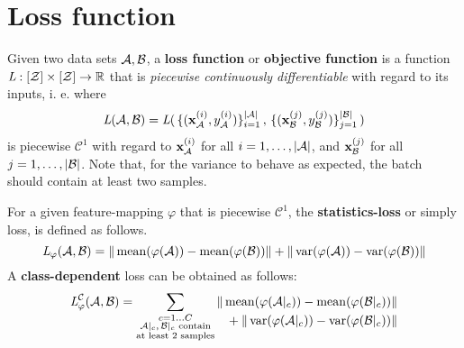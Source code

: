 \section{Loss function}
Given two data sets $\mathcal A, \mathcal B$, a \textbf{loss function} or \textbf{objective function} is a function $\textit{L} : [\mathcal Z] \times [\mathcal Z] \to \mathbb{R}$ that is \textit{piecewise continuously differentiable} with regard to its inputs,
i. e. where 
\[
    \textit{L} (\mathcal A, \mathcal B) = \textit{L} (
    \,\{(\mathbf x^{(i)}_{\mathcal A}, y^{(i)}_{\mathcal A})\}_{i=1}^{|\mathcal A|}\,,
    \,\{(\mathbf x^{(j)}_{\mathcal B}, y^{(j)}_{\mathcal B})\}_{j=1}^{|\mathcal B|}\,) 
\]
is piecewise $\mathcal C^1$ with regard to $\mathbf x^{(i)}_{\mathcal A}$
for all $i=1, \dots, |\mathcal A|$, and $\mathbf x^{(j)}_{\mathcal B}$ for all $j=1, \dots, |\mathcal B|$.
Note that, for the variance to behave as expected, the batch should contain at least two samples.

For a given feature-mapping $\varphi$ that is piecewise $\mathcal C ^1$, the \textbf{statistics-loss} or simply loss, is defined as follows.
% 
\begin{equation}
    \textit{L} _{\varphi} (\mathcal A, \mathcal B) = 
    \|\operatorname{mean} ({\varphi (\mathcal A)}) - \operatorname{mean} ({\varphi (\mathcal B)})\| +
    \|\operatorname{var} ({\varphi (\mathcal A)}) - \operatorname{var} ({\varphi (\mathcal B)})\|
    \label{eqn:statistics_loss}
\end{equation}
% 
A \textbf{class-dependent} loss can be obtained as follows:
\begin{equation}
\label{eqn:class_statistics_loss}
    \textit{L} _\varphi ^{\mathcal C} (\mathcal A, \mathcal B) =
    \sum _{\substack{c = 1 \dots C \\ \mathcal A|_c,\, \mathcal B|_c \text{ contain} \\ \text{at least 2 samples}}}
    \begin{alignedat}[t]{1}
        \|\operatorname{mean} ({\varphi (\mathcal A|_c)}) - \operatorname{mean}({\varphi (\mathcal B|_c)}) &\| \\
        {} + \|\operatorname{var} ({\varphi (\mathcal A|_c)}) - \operatorname{var} ({\varphi (\mathcal B|_c)}) &\| 
    \end{alignedat}
\end{equation}

